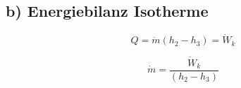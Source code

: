 \subsection*{b) Energiebilanz Isotherme}

\[
Q = \dot{m} (h_2 - h_3) = \dot{W}_k
\]

\[
\dot{m} = \frac{\dot{W}_k}{(h_2 - h_3)}
\]